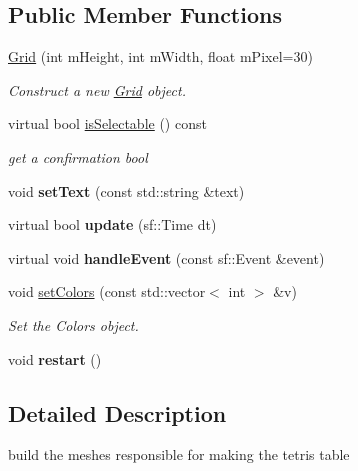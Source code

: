 \subsection*{Public Member Functions}
\begin{DoxyCompactItemize}
\item 
\hyperlink{classGrid_ae4e9e4e01ed8d1ffe5f4bf560680362e}{Grid} (int m\+Height, int m\+Width, float m\+Pixel=30)
\begin{DoxyCompactList}\small\item\em Construct a new \hyperlink{classGrid}{Grid} object. \end{DoxyCompactList}\item 
virtual bool \hyperlink{classGrid_a4ef4763b55dc2696af8a71fdeabe999a}{is\+Selectable} () const
\begin{DoxyCompactList}\small\item\em get a confirmation bool \end{DoxyCompactList}\item 
\mbox{\label{classGrid_acaae18fea153b8ad2973597b7db449f9}} 
void {\bfseries set\+Text} (const std\+::string \&text)
\item 
\mbox{\label{classGrid_aa933917cfed17cc246121c16ee2621ed}} 
virtual bool {\bfseries update} (sf\+::\+Time dt)
\item 
\mbox{\label{classGrid_a2e0f15ff4079c91bfb40e519268a09b9}} 
virtual void {\bfseries handle\+Event} (const sf\+::\+Event \&event)
\item 
void \hyperlink{classGrid_a7a93d93a3acaac29bc8fa81ecf30f877}{set\+Colors} (const std\+::vector$<$ int $>$ \&v)
\begin{DoxyCompactList}\small\item\em Set the Colors object. \end{DoxyCompactList}\item 
\mbox{\label{classGrid_a4a7063b92ed09312e51c4a7fa0c2a0f0}} 
void {\bfseries restart} ()
\end{DoxyCompactItemize}


\subsection{Detailed Description}
build the meshes responsible for making the tetris table 

